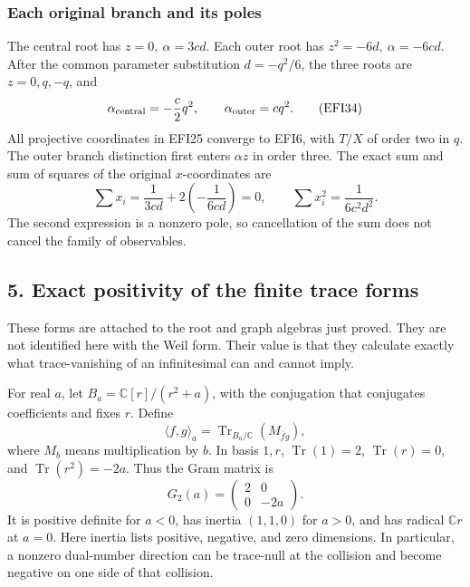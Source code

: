\documentclass[
  10pt,
  a4paper,
]{article}
\begin{document}
\subsubsection{Each original branch and its
poles}\label{each-original-branch-and-its-poles}

The central root has \(z=0,\ \alpha=3cd\). Each outer root has
\(z^2=-6d,\ \alpha=-6cd\). After the common parameter substitution
\(d=-q^2/6\), the three roots are \(z=0,q,-q\), and \[
\alpha_{\rm central}=-\frac c2q^2,
\qquad \alpha_{\rm outer}=cq^2.
\tag{EFI34}
\] All projective coordinates in EFI25 converge to EFI6, with \(T/X\) of
order two in \(q\). The outer branch distinction first enters
\(\alpha z\) in order three. The exact sum and sum of squares of the
original \(x\)-coordinates are \[
\sum x_i=\frac1{3cd}+2\left(-\frac1{6cd}\right)=0,
\qquad
\sum x_i^2=\frac1{6c^2d^2}.
\tag{EFI35}
\] The second expression is a nonzero pole, so cancellation of the sum
does not cancel the family of observables.

\subsection{5. Exact positivity of the finite trace
forms}\label{exact-positivity-of-the-finite-trace-forms}

These forms are attached to the root and graph algebras just proved.
They are not identified here with the Weil form. Their value is that
they calculate exactly what trace-vanishing of an infinitesimal can and
cannot imply.

For real \(a\), let \(B_a=\mathbb C[r]/(r^2+a)\), with the conjugation
that conjugates coefficients and fixes \(r\). Define \[
\langle f,g\rangle_a=
\operatorname{Tr}_{B_a/\mathbb C}(M_{\overline f g}),
\tag{EFI36}
\] where \(M_b\) means multiplication by \(b\). In basis \(1,r\),
\(\operatorname{Tr}(1)=2\), \(\operatorname{Tr}(r)=0\), and
\(\operatorname{Tr}(r^2)=-2a\). Thus the Gram matrix is \[
G_2(a)=\begin{pmatrix}2&0\\0&-2a\end{pmatrix}.
\tag{EFI37}
\] It is positive definite for \(a<0\), has inertia \((1,1,0)\) for
\(a>0\), and has radical \(\mathbb C r\) at \(a=0\). Here inertia lists
positive, negative, and zero dimensions. In particular, a nonzero
dual-number direction can be trace-null at the collision and become
negative on one side of that collision.
\end{document}
